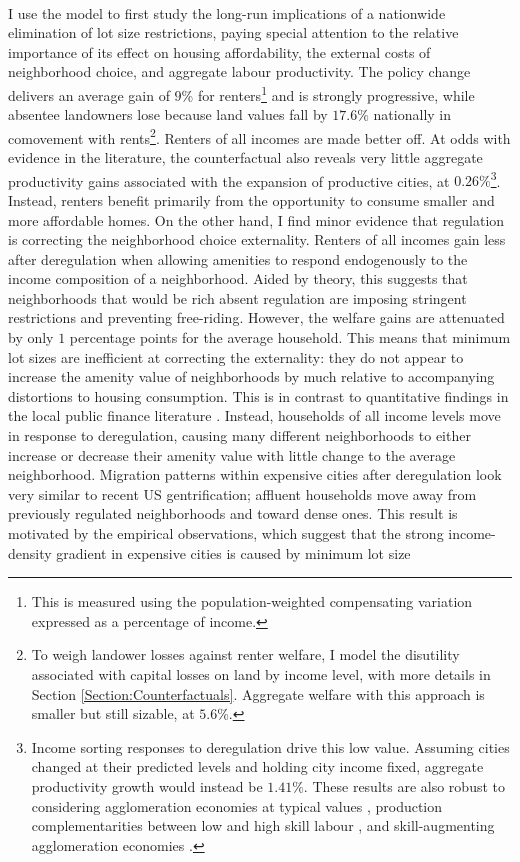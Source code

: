 \documentclass[12pt]{article}
\begin{document}
	\paragraph*{}
	I use the model to first study the long-run implications of a nationwide elimination of lot size restrictions, paying special attention to the relative importance of its effect on housing affordability, the external costs of neighborhood choice, and aggregate labour productivity. The policy change delivers an average gain of $9 \%$ for renters\footnote{This is measured using the population-weighted compensating variation expressed as a percentage of income.} and is strongly progressive, while absentee landowners lose because land values fall by $17.6 \%$ nationally in comovement with rents\footnote{To weigh landower losses against renter welfare, I model the disutility associated with capital losses on land by income level, with more details in Section \ref{Section:Counterfactuals}. Aggregate welfare with this approach is smaller but still sizable, at $5.6 \%$. }. Renters of all incomes are made better off. At odds with evidence in the literature, the counterfactual also reveals very little aggregate productivity gains associated with the expansion of productive cities, at $0.26 \%$\footnote{Income sorting responses to deregulation drive this low value. Assuming cities changed at their predicted levels and holding city income fixed, aggregate productivity growth would instead be $1.41\%$. These results are also robust to considering agglomeration economies at typical values \citep{Combes_review}, production complementarities between low and high skill labour \citep{card}, and skill-augmenting agglomeration economies \citep{diamond2016, ineqincreased}.}. Instead, renters benefit primarily from the opportunity to consume smaller and more affordable homes. On the other hand, I find minor evidence that regulation is correcting the neighborhood choice externality. Renters of all incomes gain less after deregulation when allowing amenities to respond endogenously to the income composition of a neighborhood. Aided by theory, this suggests that neighborhoods that would be rich absent regulation are imposing stringent restrictions and preventing free-riding. However, the welfare gains are attenuated by only $1$ percentage points for the average household. This means that minimum lot sizes are inefficient at correcting the externality: they do not appear to increase the amenity value of neighborhoods by much relative to accompanying distortions to housing consumption. This is in contrast to quantitative findings in the local public finance literature \citep{calabresetal, ineffTiebout}. Instead, households of all income levels move in response to deregulation, causing many different neighborhoods to either increase or decrease their amenity value with little change to the average neighborhood. Migration patterns within expensive cities after deregulation look very similar to recent US gentrification; affluent households move away from previously regulated neighborhoods and toward dense ones. This result is motivated by the empirical observations, which suggest that the strong income-density gradient in expensive cities is caused by minimum lot size 
\end{document}
